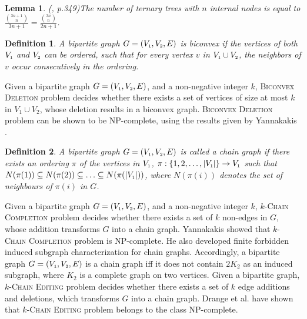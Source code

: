 \documentclass[review, 1p]{elsarticle}
\newtheorem{lemma}{Lemma}
\newtheorem{definition}{Definition}
\begin{document}
\begin{lemma} (\cite{graham1989concrete}, p.349)\label{tern}
The number of ternary trees with $n$ internal nodes is equal to $\frac {\binom {3n+1} {n}} {3n+1} = \frac {\binom {3n} {n}} {2n+1}$.
\end{lemma}
\begin{definition}\label{biconvex} \textup{A bipartite graph $G=(V_{\mathsmaller{1}},V_{\mathsmaller{2}},E)$ is \textit{biconvex} if the vertices of both $V_{\mathsmaller{1}}$ and $V_{\mathsmaller{2}}$ can be ordered, such that for every vertex $v$ in $V_{\mathsmaller{1}} \cup V_{\mathsmaller{2}}$, the neighbors of $v$ occur consecutively in the ordering.} \end{definition} \noindent Given a bipartite graph $G=(V_{\mathsmaller{1}},V_{\mathsmaller{2}},E)$, and a non-negative integer $k$, \textsc{Biconvex Deletion} problem decides whether there exists a set of vertices of size at most $k$ in $V_{1} \cup V_{2}$, whose deletion results in a biconvex graph. \textsc{Biconvex Deletion} problem can be shown to be NP-complete, using the results given by Yannakakis \cite{yannakakis1978node,yannakakis1981node}. \begin{definition} \label{chain}\textup{A bipartite graph $G=(V_{\mathsmaller{1}},V_{\mathsmaller{2}},E)$ is called a \textit{chain graph} \cite{natanzon2001complexity} if there exists an ordering $\pi$ of the vertices in $V_{\mathsmaller{1}}$, $\pi: \{1, 2, \ldots, \vert V_{\mathsmaller{1}} \vert\} \rightarrow V_{\mathsmaller{1}}$ such that $N(\pi(1)) \subseteq N(\pi(2)) \subseteq \ldots \subseteq N(\pi(\vert V_{\mathsmaller{1}} \vert))$, where $N(\pi(i))$ denotes the set of neighbours of $\pi(i)$ in $G$.}\end{definition} \noindent Given a bipartite graph $G=(V_{\mathsmaller{1}}, V_{\mathsmaller{2}}, E)$, and a non-negative integer $k$,  \textsc{$k$-Chain Completion} problem decides whether there exists a set of $k$ non-edges in $G$, whose addition transforms $G$ into a chain graph. Yannakakis \cite{yannakakis1981computing} showed that \textsc{$k$-Chain Completion} problem is NP-complete. He also developed finite forbidden induced subgraph characterization for chain graphs. Accordingly, a bipartite graph $G=(V_{\mathsmaller{1}},V_{\mathsmaller{2}},E)$ is a chain graph iff it does not contain $2K_{2}$ as an induced subgraph, where $K_{2}$ is a complete graph on two vertices. Given a bipartite graph, \textsc{$k$-Chain Editing} problem decides whether there exists a set of $k$ edge additions and deletions, which transforms $G$ into a chain graph. Drange et al. \cite{chainEditing} have shown that $k$-\textsc{Chain Editing} problem belongs to the class NP-complete.
\end{document}
